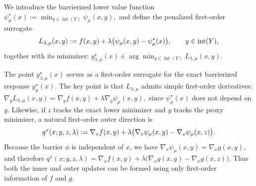 \documentclass{article}
\begin{document}
We introduce the barrierized lower value function $\psi_\mu^\star(x)
:=
\min_{y\in\operatorname{int}(Y)} \psi_\mu(x,y),$
and define the penalized first-order surrogate
\begin{equation}\label{eq:L_lam_mu}
L_{\lambda,\mu}(x,y)
:=
f(x,y)+\lambda\bigl(\psi_\mu(x,y)-\psi_\mu^\star(x)\bigr),
\qquad y\in\operatorname{int}(Y), \notag
\end{equation}
together with its minimizer:
\(y_{\lambda,\mu}^\star(x)
\in
\arg\min_{y\in\operatorname{int}(Y)} L_{\lambda,\mu}(x,y).\)

The point \(y_{\lambda,\mu}^\star(x)\) serves as a first-order surrogate for the exact barrierized
response \(y_\mu^\star(x)\). The key point is that \(L_{\lambda,\mu}\) admits simple first-order derivatives: $\nabla_y L_{\lambda,\mu}(x,y)
=
\nabla_y f(x,y)+\lambda \nabla_y \psi_\mu(x,y),$
since \(\psi_\mu^\star(x)\) does not depend on \(y\). Likewise, if \(z\) tracks the exact lower
minimizer and \(y\) tracks the proxy minimizer, a natural first-order outer direction is
\begin{equation}\label{eq:qx_def_intro}
q^x(x;y,z,\lambda)
:=
\nabla_x f(x,y)+\lambda\bigl(\nabla_x\psi_\mu(x,y)-\nabla_x\psi_\mu(x,z)\bigr). \notag
\end{equation}
Because the barrier \(\phi\) is independent of \(x\), we have $\nabla_x\psi_\mu(x,y)=\nabla_x g(x,y),$ and therefore $q^x(x;y,z,\lambda)
=
\nabla_x f(x,y)+\lambda\bigl(\nabla_x g(x,y)-\nabla_x g(x,z)\bigr).$
Thus both the inner and outer updates can be formed using only first-order information of
\(f\) and \(g\).
\end{document}
